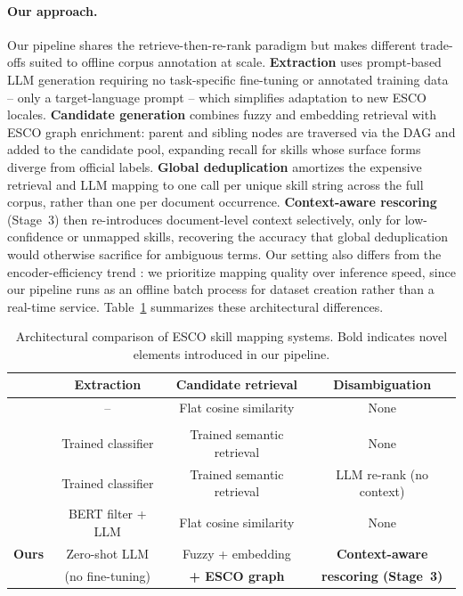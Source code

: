 \documentclass[11pt]{article}
\begin{document}
\paragraph{Our approach.}
Our pipeline shares the retrieve-then-re-rank paradigm but makes different trade-offs suited to offline corpus annotation at scale. \textbf{Extraction} uses prompt-based LLM generation requiring no task-specific fine-tuning or annotated training data -- only a target-language prompt -- which simplifies adaptation to new ESCO locales. \textbf{Candidate generation} combines fuzzy and embedding retrieval with ESCO graph enrichment: parent and sibling nodes are traversed via the DAG and added to the candidate pool, expanding recall for skills whose surface forms diverge from official labels. \textbf{Global deduplication} amortizes the expensive retrieval and LLM mapping to one call per unique skill string across the full corpus, rather than one per document occurrence. \textbf{Context-aware rescoring} (Stage~3) then re-introduces document-level context selectively, only for low-confidence or unmapped skills, recovering the accuracy that global deduplication would otherwise sacrifice for ambiguous terms. Our setting also differs from the encoder-efficiency trend \citep{Decorte2025}: we prioritize mapping quality over inference speed, since our pipeline runs as an offline batch process for dataset creation rather than a real-time service. Table~\ref{tab:comparison} summarizes these architectural differences.

\begin{table}[t]
\centering
\small
\begin{tabular}{@{}lccc@{}}
\toprule
& \textbf{Extraction} & \textbf{Candidate retrieval} & \textbf{Disambiguation} \\
\midrule
\citet{Kavargyris2025} &  --  & Flat cosine similarity  & None \\
 \citet{nesta}&  &   &  \\[4pt]

\citet{Decorte2023, Decorte2025} & Trained classifier & Trained semantic retrieval  & None \\[4pt]
\citet{Clavi2023} & Trained classifier & Trained semantic retrieval  & LLM re-rank (no context) \\[4pt]
\citet{Malandri2025} & BERT filter + LLM & Flat cosine similarity & None \\[4pt]
\textbf{Ours} & Zero-shot LLM & Fuzzy + embedding  & \textbf{Context-aware} \\
& (no fine-tuning) & \textbf{+ ESCO graph}  & \textbf{rescoring (Stage~3)} \\
\bottomrule
\end{tabular}
\caption{Architectural comparison of ESCO skill mapping systems. Bold indicates novel elements introduced in our pipeline.}
\label{tab:comparison}
\end{table}
\end{document}
